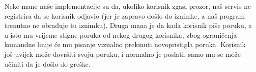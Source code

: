 \documentclass[10pt,a4paper,onecolumn,titlepage]{article}
\begin{document}
Neke mane naše implementacije su da, ukoliko korisnik zgasi prozor, naš servis
ne registrira da se korisnik odjavio (jer je zapravo došlo do iznimke, a naš
program trenutno ne obrađuje tu iznimku). Druga mana je da kada korisnik
piše poruku, a u isto mu vrijeme stigne poruka od nekog drugog korisnika,
zbog ograničenja komandne linije će mu pisanje vizualno prekinuti novopristigla
poruka. Korisnik još uvijek može dovršiti svoju poruku, i normalno je poslati,
samo mu se može učiniti da je došlo do greške.
\end{document}
